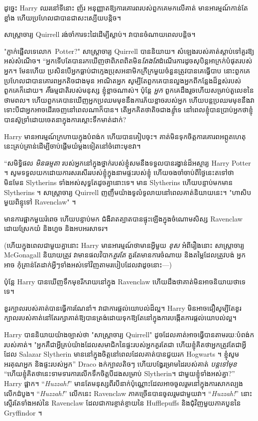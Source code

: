 {{{{{ដូច្នេះ Harry ឈរនៅទីនោះ ញ័រ អនុញ្ញាតឱ្យការគោរពរបស់ពួកគេមកលើគាត់ មានអារម្មណ៍កាន់តែខ្លាំង ហើយប្រហែលជាបានជាសះស្បើយបន្តិច។

សាស្រ្តាចារ្យ Quirrell រង់ចាំការទះដៃដើម្បីស្លាប់។ វាបានចំណាយពេលបន្តិច។

"ភ្ញាក់ផ្អើលទេលោក~Potter?" សាស្ត្រាចារ្យ Quirrell បាននិយាយ។ សំឡេងរបស់គាត់ស្តាប់ទៅគួរឱ្យអស់សំណើច។ “អ្នកទើបតែបានរកឃើញថាពិភពពិតមិន\emph{តែងតែ}ដំណើរការដូចសុបិន្តអាក្រក់បំផុតរបស់អ្នក។ មែនហើយ ប្រសិនបើអ្នកធ្លាប់ជាក្មេងប្រុសអនាមិកក្រីក្រមួយចំនួនត្រូវបានគេធ្វើបាប នោះពួកគេប្រហែលជាបានគោរពអ្នកតិចជាងមុន អាណិតអ្នក សូម្បីតែពួកគេបានលួងអ្នកពីកន្លែងដ៏ខ្ពស់របស់ពួកគេក៏ដោយ។ \emph{គឺ}ធម្មជាតិរបស់មនុស្ស ខ្ញុំខ្លាចណាស់។ ប៉ុន្តែ \emph{អ្នក} ពួកគេដឹងរួចហើយសម្រាប់តួលេខនៃថាមពល។ ហើយពួកគេបានឃើញអ្នកប្រឈមមុខនឹងការភ័យខ្លាចរបស់អ្នក ហើយបន្តប្រឈមមុខនឹងវា ទោះបីជាអ្នកអាចដើរចេញនៅពេលណាក៏បាន។ តើអ្នកគិតថាតិចជាង\emph{ខ្ញុំ}ទេ នៅពេលខ្ញុំបានប្រាប់អ្នកថាខ្ញុំបានស៊ូទ្រាំដោយចេតនាក្នុងការស្ដោះទឹកមាត់ដាក់?

Harry មាន​អារម្មណ៍​ក្រហាយ​ក្នុង​បំពង់ក ហើយ​បាន​គៀប​ចុះ។ គាត់មិនទុកចិត្តការគោរពអព្ភូតហេតុនេះគ្រប់គ្រាន់ដើម្បីចាប់ផ្តើមយំម្តងទៀតនៅចំពោះមុខវា។

“សមិទ្ធិផល \emph{មិនធម្មតា} របស់អ្នកនៅក្នុងថ្នាក់របស់ខ្ញុំសមនឹងទទួលបានរង្វាន់ដ៏អស្ចារ្យ Harry Potter ។ សូមទទួលយកដោយការសរសើររបស់ខ្ញុំក្នុងនាមផ្ទះរបស់ខ្ញុំ ហើយចងចាំចាប់ពីថ្ងៃនេះតទៅថា មិនមែន Slytherins ទាំងអស់សុទ្ធតែដូចគ្នានោះទេ។ មាន Slytherins ហើយបន្ទាប់មកមាន Slytherins ។ សាស្រ្តាចារ្យ Quirrell ញញឹមយ៉ាងទូលំទូលាយនៅពេលគាត់និយាយនេះ។ "ហាសិបមួយពិន្ទុទៅ Ravenclaw" ។

មានការផ្អាកមួយរំពេច ហើយបន្ទាប់មក ជំងឺរាតត្បាតបានផ្ទុះឡើងក្នុងចំណោមសិស្ស Ravenclaw ដោយស្រែកយំ និងហួច និងអបអរសាទរ។

(ហើយក្នុងពេលជាមួយគ្នានោះ Harry មានអារម្មណ៍ថាមានអ្វីមួយ \emph{ខុស} អំពីរឿងនោះ សាស្រ្តាចារ្យ McGonagall និយាយត្រូវ វាមានផលវិបាក\emph{គួរតែ} គួរតែមានការចំណាយ និងតម្លៃដែលត្រូវបង់ អ្នកអាច កុំ​គ្រាន់តែ​ដាក់​អ្វីៗ​ទាំងអស់​ទៅ​វិញ​តាម​របៀប​ដែល​វា​ដូច​នោះ—)

ប៉ុន្តែ Harry បានឃើញទឹកមុខរីករាយនៅក្នុង Ravenclaw ហើយដឹងថាគាត់មិនអាចនិយាយថាទេទេ។

ខួរក្បាលរបស់គាត់បានធ្វើការណែនាំ។ វា​ជា​ការ​ផ្ដល់​យោបល់​ដ៏​ល្អ។ Harry មិន​អាច​ជឿ​សូម្បី​តែ​ខួរ​ក្បាល​របស់​គាត់​នៅ​តែ​រក្សា​គាត់​ឱ្យ​បាន​ត្រង់​ដោយ​ទុក​ឱ្យ​តែ​នៅ​ក្នុង​ការ​បង្កើត​ការ​ផ្ដល់​យោបល់​ល្អ​។

Harry បាននិយាយយ៉ាងច្បាស់ថា "សាស្រ្តាចារ្យ Quirrell" ដូចដែលគាត់អាចធ្វើបានតាមរយៈបំពង់ករបស់គាត់។ "អ្នកគឺជាអ្វីគ្រប់យ៉ាងដែលសមាជិកនៃផ្ទះរបស់អ្នកគួរតែជា ហើយខ្ញុំគិតថាអ្នកត្រូវតែជាអ្វីដែល Salazar Slytherin មាននៅក្នុងចិត្តនៅពេលដែលគាត់បានជួយរក Hogwarts ។ ខ្ញុំសូមអរគុណអ្នក និងផ្ទះរបស់អ្នក” Draco ងក់ក្បាលតិចៗ ហើយបង្វែរម្រាមដៃរបស់គាត់ \emph{បន្តទៅមុខ} “ហើយខ្ញុំគិតថានេះទាមទារការលើកទឹកចិត្តបីដងសម្រាប់ Slytherin។ ជាមួយខ្ញុំទាំងអស់គ្នា?” Harry ផ្អាក។ “\emph{Huzzah!}” មានតែមនុស្សពីរបីនាក់ប៉ុណ្ណោះដែលអាចចូលរួមនៅក្នុងការសាកល្បងលើកដំបូង។ “\emph{Huzzah!}” លើកនេះ Ravenclaw ភាគច្រើនបានចូលរួមជាមួយវា។ “\emph{Huzzah!}” នោះស្ទើរតែទាំងអស់នៃ Ravenclaw ដែលជាការខ្ចាត់ខ្ចាយនៃ Hufflepuffs និងជុំវិញមួយភាគបួននៃ Gryffindor ។

}}}}}

